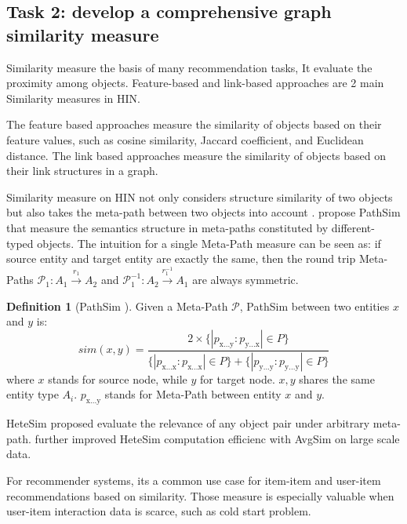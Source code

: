 \documentclass[12pt,a4 paper,title page]{article}
\theoremstyle{definition}
\newtheorem{definition}{Definition}[section]
\begin{document}
\subsection{Task 2: develop a comprehensive graph similarity measure}

Similarity measure the basis of many recommendation tasks, It evaluate the proximity among objects. Feature-based and link-based approaches are 2 main Similarity measures in HIN. 

The feature based approaches measure the similarity of objects based on their feature values, such as cosine similarity, Jaccard coefficient, and Euclidean distance. The link based approaches measure the similarity of objects based on their link structures in a graph. 

Similarity measure on HIN not only considers structure similarity of two objects but also takes the meta-path between two objects into account \citep{Shi2017}. \citet{Sun2011PathSim} propose PathSim that measure the semantics structure in meta-paths constituted by different-typed objects. The intuition for a single Meta-Path measure can be seen as: if source entity and target entity are exactly the same, then the round trip Meta-Paths $\mathcal{P}_1: A_1 \xrightarrow{r_1} A_2$ and 
$\mathcal{P}_1^{-1}: A_2 \xrightarrow{r_1^{-1}} A_1$ are always symmetric.

\theoremstyle{definition}
\begin{definition}[PathSim \cite{Sun2011PathSim}]\label{def:pathsim}
    Given a Meta-Path $\mathcal{P}$, PathSim between two entities $x$ and $y$ is:
    \begin{equation}
        sim(x,y)=\frac{2 \times \{|p_\text{x...y}:p_\text{y...x}| \in P\}}{\{|p_\text{x...x}:p_\text{x...x}| \in P\} + \{|p_\text{y...y}:p_\text{y...y}| \in P\}}
    \end{equation}
    where $x$ stands for source node, while $y$ for target node. 
    $x, y$ shares the same entity type $A_i$.
    $p_\text{x...y}$ stands for Meta-Path between entity $x$ and $y$. 
\end{definition}

HeteSim \citep{Shi2013HeteSim} proposed evaluate the relevance of any object pair under arbitrary meta-path. \citet{xiao2016avgsim} further improved HeteSim computation efficienc with AvgSim on large scale data.

For recommender systems, its a common use case for item-item and user-item recommendations based on similarity. Those measure is especially valuable when user-item interaction data is scarce, such as cold start problem. 
\end{document}

